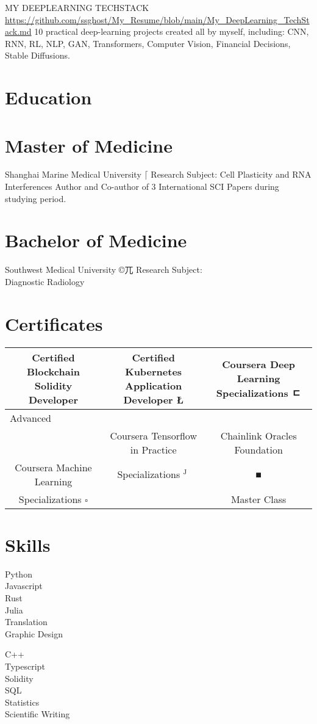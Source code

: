 \documentclass[10pt]{article}
\begin{document}
MY DEEPLEARNING TECHSTACK\\
\href{https://github.com/ssghost/My_Resume/blob/main/My_DeepLearning_TechStack.md}{https://github.com/ssghost/My\_Resume/blob/main/My\_DeepLearning\_TechStack.md} 10 practical deep-learning projects created all by myself, including: CNN, RNN, RL, NLP, GAN, Transformers, Computer Vision, Financial Decisions, Stable Diffusions.

\section*{Education}
\section*{Master of Medicine}
Shanghai Marine Medical University $\lceil$ Research Subject: Cell Plasticity and RNA Interferences Author and Co-author of 3 International SCI Papers during studying period.

\section*{Bachelor of Medicine}
Southwest Medical University ©兀 Research Subject:\\
Diagnostic Radiology

\section*{Certificates}
\begin{center}
\begin{tabular}{|c|c|c|}
\hline
Certified Blockchain Solidity Developer & Certified Kubernetes Application Developer Ł & Coursera Deep Learning Specializations ㄷ \\
\hline
\multicolumn{3}{|l|}{Advanced} \\
\hline
 & Coursera Tensorflow in Practice & Chainlink Oracles Foundation \\
\hline
Coursera Machine Learning & Specializations ${ }^{\text {J }}$ & ■ \\
\hline
Specializations $\square$ &  & Master Class \\
\hline
\end{tabular}
\end{center}

\section*{Skills}
Python\\
Javascript\\
Rust\\
Julia\\
Translation\\
Graphic Design

C++\\
Typescript\\
Solidity\\
SQL\\
Statistics\\
Scientific Writing
\end{document}
